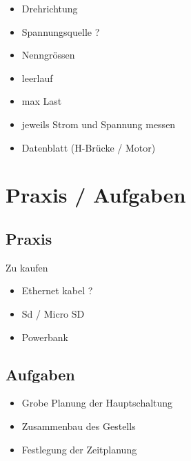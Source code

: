\documentclass{article}
\begin{document}
\begin{itemize}

	\item Drehrichtung

	\item Spannungsquelle ? 

	\item Nenngr\"{o}ssen

	\item leerlauf

	\item max Last

	\item jeweils Strom und Spannung messen

	\item Datenblatt (H-Br\"{u}cke / Motor)

\end{itemize}

\section{Praxis / Aufgaben}

\subsection{Praxis}

Zu kaufen

\begin{itemize}

	\item Ethernet kabel ? 

	\item Sd / Micro SD

	\item Powerbank

\end{itemize}

\subsection{Aufgaben}

\begin{itemize}

	\item Grobe Planung der Hauptschaltung 

	\item Zusammenbau des Gestells

	\item Festlegung der Zeitplanung

\end{itemize}
\end{document}
